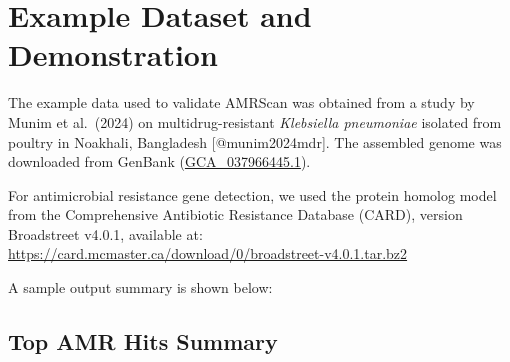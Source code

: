 \section{Example Dataset and
Demonstration}\label{example-dataset-and-demonstration}

The example data used to validate AMRScan was obtained from a study by
Munim et al.~(2024) on multidrug-resistant \emph{Klebsiella pneumoniae}
isolated from poultry in Noakhali, Bangladesh {[}@munim2024mdr{]}. The
assembled genome was downloaded from GenBank
(\href{https://www.ncbi.nlm.nih.gov/assembly/GCA_037966445.1}{GCA\_037966445.1}).

For antimicrobial resistance gene detection, we used the protein homolog
model from the Comprehensive Antibiotic Resistance Database (CARD),
version Broadstreet v4.0.1, available at:\\
\url{https://card.mcmaster.ca/download/0/broadstreet-v4.0.1.tar.bz2}

A sample output summary is shown below:

\subsection{Top AMR Hits Summary}\label{top-amr-hits-summary}

